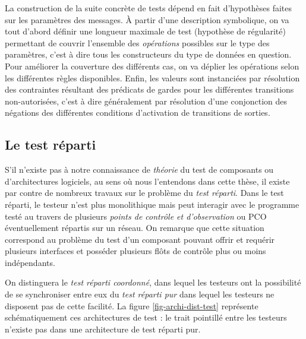 La construction de la suite concr\`ete de tests d\'epend en fait
d'hypoth\`eses faites sur les param\`etres des messages. \`A partir
d'une description symbolique, on va tout
d'abord d\'efinir une longueur maximale de test (hypoth\`ese de
r\'egularit\'e) permettant de couvrir l'ensemble des \emph{op\'erations}
possibles sur le type des param\`etres, c'est \`a dire tous les
constructeurs du type de donn\'ees en question. Pour am\'eliorer la
couverture des diff\'erents cas, on va d\'eplier les op\'erations
selon les diff\'erentes r\`egles disponibles. Enfin, les valeurs
sont instanci\'ees par r\'esolution des contraintes r\'esultant des
pr\'edicats de gardes pour les diff\'erentes transitions
non-autoris\'ees, c'est \`a dire g\'en\'eralement par
r\'esolution d'une conjonction des n\'egations des diff\'erentes
conditions d'activation de transitions de sorties. 

\subsection{Le test r\'eparti}
\label{sec:le-test-reparti}

\begin{floatingfigure}{.45\textwidth}
    \caption{Architecture de test r\'eparti}
    \label{fig-archi-dist-test}
\end{floatingfigure}

S'il n'existe pas \`a notre connaissance de \emph{th\'eorie} du test de
composants ou d'architectures logiciels, au sens o\`u nous l'entendons
dans cette th\`ese, il existe par contre de nombreux travaux sur le
probl\`eme du \emph{test r\'eparti}. Dans le test r\'eparti,  le testeur n'est plus  monolithique
mais peut interagir avec le programme test\'e au travers de plusieurs
\emph{points de contr\^ole et d'observation} ou  \textsf{PCO}
\'eventuellement r\'epartis sur un r\'eseau. On remarque que cette 
situation  correspond au probl\`eme du test d'un composant
pouvant offrir et requ\'erir plusieurs interfaces et poss\'eder
plusieurs fl\^ots de contr\^ole  plus ou moins ind\'ependants.

On distinguera le \emph{test r\'eparti coordonn\'e}, dans lequel les
testeurs  ont la possibilit\'e de se synchroniser entre eux du \emph{test r\'eparti pur}
dans lequel les testeurs ne disposent pas de cette facilit\'e. La
figure \ref{fig-archi-dist-test} repr\'esente sch\'ematiquement ces
architectures de test : le trait pointill\'e entre les testeurs
n'existe pas dans une architecture de test r\'eparti pur.

